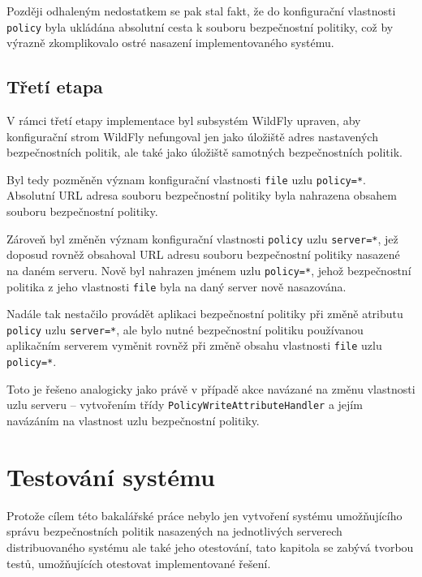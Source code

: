 Později odhaleným nedostatkem se pak stal fakt, že do konfigurační vlastnosti {\tt policy} byla ukládána absolutní cesta k souboru bezpečnostní politiky, což by výrazně zkomplikovalo ostré nasazení implementovaného systému.

\section{Třetí etapa}

V rámci třetí etapy implementace byl subsystém WildFly upraven, aby konfigurační strom WildFly nefungoval jen jako úložiště adres nastavených bezpečnostních politik, ale také jako úložiště samotných bezpečnostních politik.

Byl tedy pozměněn význam konfigurační vlastnosti {\tt file} uzlu {\tt policy=*}. Absolutní URL adresa souboru  bezpečnostní politiky byla nahrazena obsahem souboru bezpečnostní politiky.

Zároveň byl změněn význam konfigurační vlastnosti {\tt policy} uzlu {\tt server=*}, jež doposud rovněž obsahoval URL adresu souboru bezpečnostní politiky nasazené na daném serveru. Nově byl nahrazen jménem uzlu {\tt policy=*}, jehož bezpečnostní politika z jeho vlastnosti {\tt file} byla na daný server nově nasazována.

Nadále tak nestačilo provádět aplikaci bezpečnostní politiky při změně atributu {\tt policy} uzlu {\tt server=*}, ale bylo nutné bezpečnostní politiku používanou aplikačním serverem vyměnit rovněž při změně obsahu vlastnosti {\tt file} uzlu {\tt policy=*}.

Toto je řešeno analogicky jako právě v případě akce navázané na změnu vlastnosti uzlu serveru -- vytvořením třídy {\tt PolicyWriteAttributeHandler} a jejím navázáním na vlastnost uzlu bezpečnostní politiky.

\chapter{Testování systému} \label{testovani}

Protože cílem této bakalářské práce nebylo jen vytvoření systému umožňujícího správu bezpečnostních politik nasazených na jednotlivých serverech distribuovaného systému ale také jeho otestování, tato kapitola se zabývá tvorbou testů, umožňujících otestovat implementované řešení.

